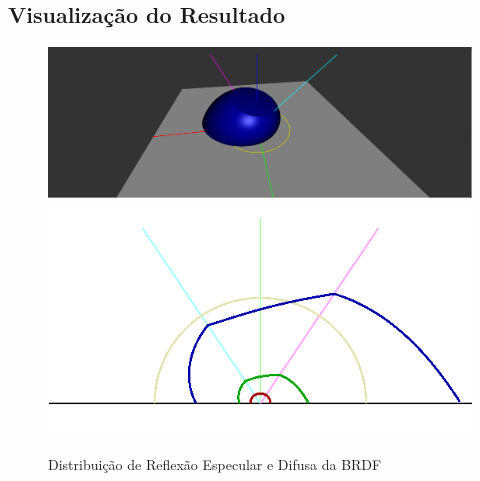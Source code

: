 \subsection{Visualização do Resultado}
\begin{figure}[H]
    \caption{\small{Distribuição de Reflexão Especular e Difusa da BRDF}}\label{fig-ashikhmin-shirley-alternative-plots}
    \vspace{42px}
  \includegraphics[width=\linewidth]{./Imagens/brdfs/ashikhmin-shirley-alternative-3D-plot}
\endminipage\hfill
{}
  \includegraphics[width=\linewidth]{./Imagens/brdfs/ashikhmin-shirley-alternative-polar-plot.png}
\endminipage\hfill
\end{figure}

